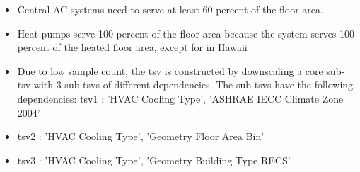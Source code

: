 \begin{itemize}
\item Central AC systems need to serve at least 60 percent of the floor area.
\item Heat pumps serve 100 percent of the floor area because the system serves 100 percent of the heated floor area, except for in Hawaii
\item Due to low sample count, the tsv is constructed by downscaling a core sub-tsv with 3 sub-tsvs of different dependencies. The sub-tsvs have the following dependencies: tsv1 : 'HVAC Cooling Type', 'ASHRAE IECC Climate Zone 2004'
\item tsv2 : 'HVAC Cooling Type', 'Geometry Floor Area Bin'
\item tsv3 : 'HVAC Cooling Type', 'Geometry Building Type RECS'
\end{itemize}
